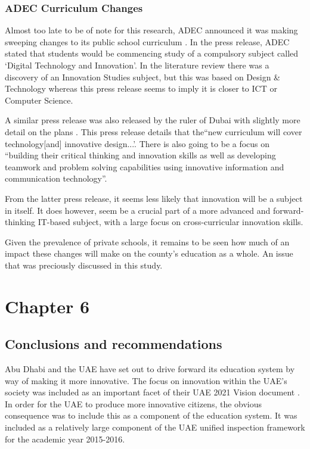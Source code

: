 \documentclass[11pt]{article}
\begin{document}
\subsubsection{ADEC Curriculum Changes}
Almost too late to be of note for this research, ADEC announced it was making sweeping changes to its public school curriculum \cite{WAM1}. In the press release, ADEC stated that students would be commencing study of a compulsory subject called `Digital Technology and Innovation'. In the literature review there was a discovery of an Innovation Studies subject, but this was based on Design \& Technology whereas this press release seems to imply it is closer to ICT or Computer Science.

A similar press release was also released by the ruler of Dubai with slightly more detail on the plans \cite{WAM2}. This press release details that  the``new curriculum will cover technology[and] innovative design...'. There is also going to be a focus on ``building their critical thinking and innovation skills as well as developing teamwork and problem solving capabilities using innovative information and communication technology''. 

From the latter press release, it seems less likely that innovation will be a subject in itself. It does however, seem be a crucial part of a more advanced and forward-thinking IT-based subject, with a large focus on cross-curricular innovation skills.

Given the prevalence of private schools, it remains to be seen how much of an impact these changes will make on the county's education as a whole. An issue that was preciously discussed in this study.

\theendnotes
\section{Chapter 6}
\subsection{Conclusions and recommendations}
Abu Dhabi and the UAE have set out to drive forward its education system by way of making it more innovative. The focus on innovation within the UAE's society was included as an important facet of their UAE 2021 Vision document \citep{UAEGovernment2012}. In order for the UAE to produce more innovative citizens, the obvious consequence was to include this as a component of the education system. It was included as a relatively large component of the UAE unified inspection framework for the academic year 2015-2016.
\end{document}
